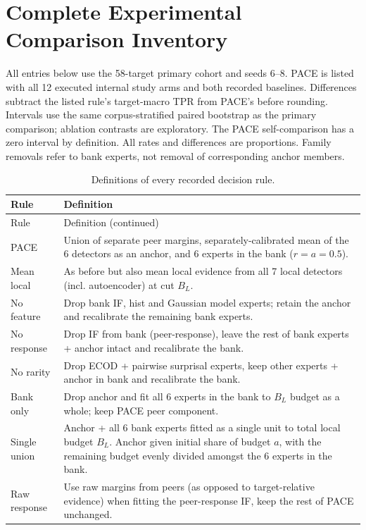 \section{Complete Experimental Comparison Inventory}
\label{app:inventory}
\setcounter{table}{0}
All entries below use the 58-target primary cohort and seeds 6--8. PACE is listed with all 12 executed internal study arms and both recorded baselines. Differences subtract the listed rule's target-macro TPR from PACE's before rounding. Intervals use the same corpus-stratified paired bootstrap as the primary comparison; ablation contrasts are exploratory. The PACE self-comparison has a zero interval by definition. All rates and differences are proportions. Family removals refer to bank experts, not removal of corresponding anchor members.

{\small
\begin{longtable}{p{}p{}}
\caption{Definitions of every recorded decision rule.}\label{tab:arm-definitions}\\
\toprule Rule & Definition\\\midrule\endfirsthead
\toprule Rule & Definition (continued)\\\midrule\endhead
\bottomrule\endfoot 
PACE & Union of separate peer margins, separately-calibrated mean of the 6 detectors as an anchor, and 6 experts in the bank ($r=a=0.5$).\\
Mean local & As before but also mean local evidence from all 7 local detectors (incl. autoencoder) at cut $B_L$.\\
No feature & Drop bank IF, hist and Gaussian model experts; retain the anchor and recalibrate the remaining bank experts.\\
No response & Drop IF from bank (peer-response), leave the rest of bank experts + anchor intact and recalibrate the bank.\\
No rarity & Drop ECOD + pairwise surprisal experts, keep other experts + anchor in bank and recalibrate the bank.\\
Bank only & Drop anchor and fit all 6 experts in the bank to $B_L$ budget as a whole; keep PACE peer component.\\
Single union & Anchor + all 6 bank experts fitted as a single unit to total local budget $B_L$. Anchor given initial share of budget $a$, with the remaining budget evenly divided amongst the 6 experts in the bank.\\
Raw response & Use raw margins from peers (as opposed to target-relative evidence) when fitting the peer-response IF, keep the rest of PACE unchanged.\\

\end{longtable}}
